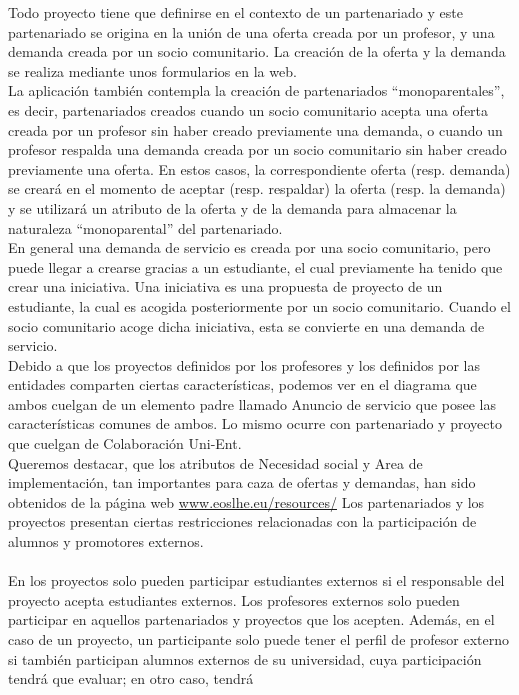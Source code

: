 \documentclass[11pt]{book}
\begin{document}
Todo proyecto tiene que definirse en el contexto de un partenariado y este partenariado se origina en la unión de una oferta creada por un profesor, y una demanda creada por un socio comunitario. La creación de la oferta y la demanda se realiza mediante unos formularios en la web.\\
La aplicación también contempla la
creación de partenariados ``monoparentales'', es decir, partenariados
creados cuando un socio comunitario acepta una oferta creada por un
profesor sin haber creado previamente una demanda, o cuando un profesor
respalda una demanda creada por un socio comunitario sin haber creado
previamente una oferta. En estos casos, la correspondiente oferta (resp.
demanda) se creará en el momento de aceptar (resp. respaldar) la oferta
(resp. la demanda) y se utilizará un atributo de la oferta y de la
demanda para almacenar la naturaleza ``monoparental'' del partenariado.\\
En general una demanda de servicio es creada por una socio comunitario, pero puede llegar a crearse gracias a un estudiante, el cual previamente ha tenido que crear una iniciativa. Una iniciativa es una propuesta de proyecto de un estudiante, la cual es acogida posteriormente por un socio comunitario. Cuando el socio comunitario acoge dicha iniciativa, esta se convierte en una demanda de servicio.\\
Debido a que los proyectos definidos por los profesores y los definidos por las entidades comparten ciertas características, podemos ver en el diagrama que ambos cuelgan de un elemento padre llamado Anuncio de servicio que posee las características comunes de ambos.
Lo mismo ocurre con partenariado y proyecto que cuelgan de Colaboración Uni-Ent.\\
Queremos destacar, que los atributos de Necesidad social y Area de implementación, tan importantes para caza de ofertas y demandas, han sido obtenidos de la página web \url{www.eoslhe.eu/resources/}
Los partenariados y los proyectos presentan ciertas restricciones relacionadas con la participación de alumnos y promotores externos.\\\\
En los proyectos solo pueden participar estudiantes externos si el responsable del proyecto acepta estudiantes externos. 
Los profesores externos solo pueden participar en aquellos partenariados y proyectos que los acepten. Además, en el caso de un proyecto, un participante solo puede tener el
perfil de profesor externo si también participan alumnos externos de su
universidad, cuya participación tendrá que evaluar; en otro caso, tendrá
\end{document}
